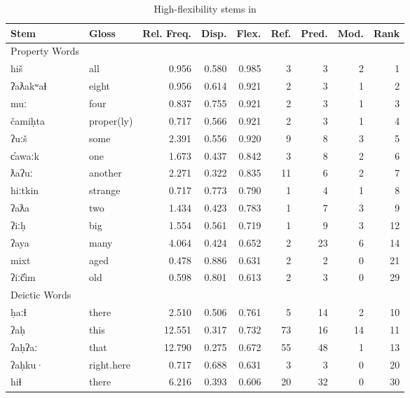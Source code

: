 \begin{table}
  \centering
  \caption{High-flexibility stems in }
  \label{tab:Nuuchahnulth-high-flexibility}
  \begin{tabular}{ l l r r r r r r r }
    \toprule
    Stem & Gloss & Rel. Freq. & Disp. & Flex. & Ref. & Pred. & Mod. & Rank\\

    \midrule
    Property Words\\
    \midrule
    hiš      & all        & 0.956 & 0.580 & 0.985 &  3 &  3 & 2 &  1\\
    ʔaƛakʷaɬ & eight      & 0.956 & 0.614 & 0.921 &  2 &  3 & 1 &  2\\
    muː      & four       & 0.837 & 0.755 & 0.921 &  2 &  3 & 1 &  3\\
    čamiḥta  & proper(ly) & 0.717 & 0.566 & 0.921 &  2 &  3 & 1 &  4\\
    ʔuːš     & some       & 2.391 & 0.556 & 0.920 &  9 &  8 & 3 &  5\\
    c̓awaːk   & one        & 1.673 & 0.437 & 0.842 &  3 &  8 & 2 &  6\\
    ƛaʔuː    & another    & 2.271 & 0.322 & 0.835 & 11 &  6 & 2 &  7\\
    hiːtkin  & strange    & 0.717 & 0.773 & 0.790 &  1 &  4 & 1 &  8\\
    ʔaƛa     & two        & 1.434 & 0.423 & 0.783 &  1 &  7 & 3 &  9\\
    ʔiːḥ     & big        & 1.554 & 0.561 & 0.719 &  1 &  9 & 3 & 12\\
    ʔaya     & many       & 4.064 & 0.424 & 0.652 &  2 & 23 & 6 & 14\\
    mixt     & aged       & 0.478 & 0.886 & 0.631 &  2 &  2 & 0 & 21\\
    ʔiːč̓im   & old        & 0.598 & 0.801 & 0.613 &  2 &  3 & 0 & 29\\

    \midrule
    Deictic Words\\
    \midrule
    ḥaːɬ   & there      &  2.510 & 0.506 & 0.761 &  5 & 14 &  2 & 10\\
    ʔaḥ    & this       & 12.551 & 0.317 & 0.732 & 73 & 16 & 14 & 11\\
    ʔaḥʔaː & that       & 12.790 & 0.275 & 0.672 & 55 & 48 &  1 & 13\\
    ʔaḥku· & right.here &  0.717 & 0.688 & 0.631 &  3 &  3 &  0 & 20\\
    hiɬ    & there      &  6.216 & 0.393 & 0.606 & 20 & 32 &  0 & 30\\

    \bottomrule
  \end{tabular}
\end{table}

